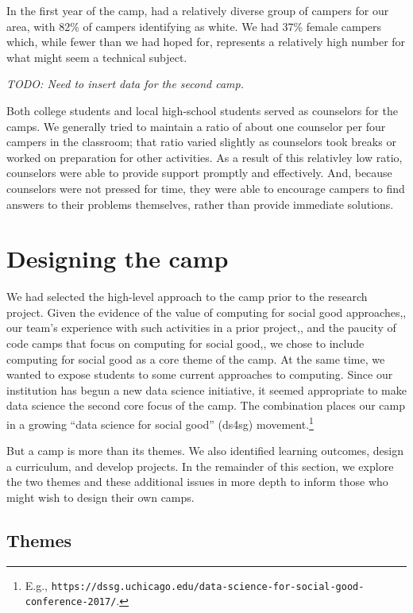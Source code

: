In the first year of the camp, had a relatively diverse group of
campers for our area, with 82\% of campers identifying as white.
We had 37\% female campers which, while fewer than we had hoped
for, represents a relatively high number for what might seem a
technical subject.

\textit{TODO: Need to insert data for the second camp.}

Both college students and local high-school students served as
counselors for the camps.  We generally tried to maintain a ratio
of about one counselor per four campers in the classroom; that ratio
varied slightly as counselors took breaks or worked on preparation
for other activities.  As a result of this relativley low ratio,
counselors were able to provide support promptly and effectively.
And, because counselors were not pressed for time, they were able
to encourage campers to find answers to their problems themselves,
rather than provide immediate solutions.

\section{Designing the camp}

We had selected the high-level approach to the camp prior to the
research project.  Given the evidence of the value of computing for
social good approaches,\cite{Goldweber2013}, our team's experience
with such activities in a prior project,\cite{arts-coding}, and the
paucity of code camps that focus on computing for social
good,\cite{code-camp-survey-sigcse-2017}, we chose to include
computing for social good as a core theme of the camp.  At the same
time, we wanted to expose students to some current approaches to
computing.  Since our institution has begun a new data science
initiative, it seemed appropriate to make data science the second
core focus of the camp.  The combination places our camp in a growing
``data science for social good'' (ds4sg) movement.\footnote{E.g.,
\texttt{https://dssg.uchicago.edu/data-science-for-social-good-conference-2017/}.}

But a camp is more than its themes.  We also identified learning
outcomes, design a curriculum, and develop projects.  In the remainder
of this section, we explore the two themes and these additional
issues in more depth to inform those who might wish to design their
own camps.

\subsection{Themes}


